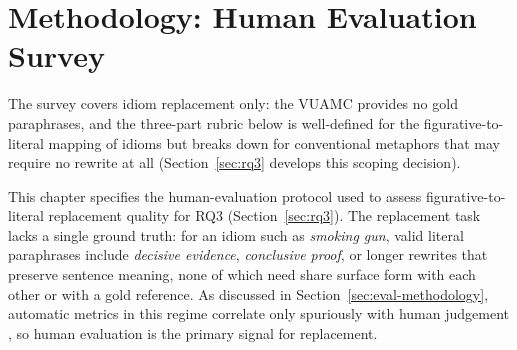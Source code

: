 \section{Methodology: Human Evaluation Survey}
\label{ch:methodology}


The survey covers idiom replacement only: the VUAMC provides no gold paraphrases, and the three-part rubric below is well-defined for the figurative-to-literal mapping of idioms but breaks down for conventional metaphors that may require no rewrite at all (Section~\ref{sec:rq3} develops this scoping decision).

This chapter specifies the human-evaluation protocol used to assess figurative-to-literal replacement quality for RQ3 (Section~\ref{sec:rq3}). The replacement task lacks a single ground truth: for an idiom such as \textit{smoking gun}, valid literal paraphrases include \textit{decisive evidence}, \textit{conclusive proof}, or longer rewrites that preserve sentence meaning, none of which need share surface form with each other or with a gold reference. As discussed in Section~\ref{sec:eval-methodology}, automatic metrics in this regime correlate only spuriously with human judgement \cite{Alva-Manchego2021,Scialom2021}, so human evaluation is the primary signal for replacement.

